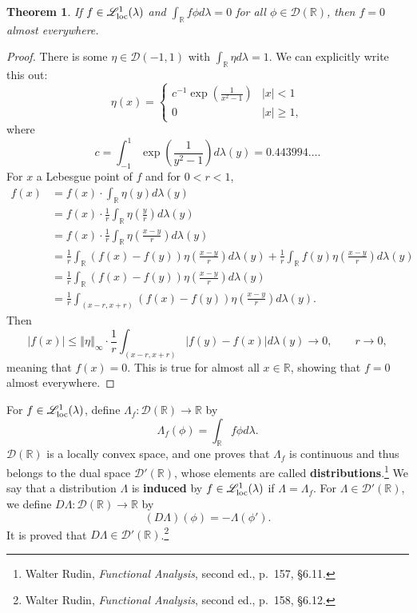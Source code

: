 \documentclass{article}
\newcommand{\Lsemiloc}{\mathscr{L}_{\ensuremath\mathrm{loc}}^1(\lambda)}
\newcommand{\norm}[1]{\left\Vert #1 \right\Vert}
\newtheorem{theorem}{Theorem}
\theoremstyle{definition}
\begin{document}
\begin{theorem}
If $f \in \Lsemiloc$  and $\int_\mathbb{R} f \phi d\lambda =0$ for all $\phi \in \mathscr{D}(\mathbb{R})$, then
$f=0$ almost everywhere.
\label{fundamental}
\end{theorem}
\begin{proof}
There is some $\eta \in \mathscr{D}(-1,1)$ with  
$\int_\mathbb{R} \eta d\lambda = 1$. We can explicitly write this out: 
\[
\eta(x) =\begin{cases}
c^{-1}  \exp\left(\frac{1}{x^2-1}\right)&|x|<1\\
 0&|x| \geq 1,
 \end{cases}
\]
where
\[
c = \int_{-1}^1 \exp\left(\frac{1}{y^2-1}\right) d\lambda(y)  = 0.443994\ldots.
\]
For $x$ a Lebesgue point of $f$   and for $0<r<1$,
\begin{align*}
f(x)&=f(x) \cdot \int_\mathbb{R} \eta(y) d\lambda(y)\\
&=f(x) \cdot \frac{1}{r} \int_\mathbb{R} \eta\left(\frac{y}{r} \right) d\lambda(y)\\
&=f(x) \cdot \frac{1}{r} \int_\mathbb{R}\eta\left(\frac{x-y}{r} \right) d\lambda(y)\\
&=\frac{1}{r} \int_\mathbb{R} (f(x)-f(y))\eta\left(\frac{x-y}{r} \right) d\lambda(y) 
+\frac{1}{r} \int_\mathbb{R} f(y) \eta\left(\frac{x-y}{r} \right) d\lambda(y)\\
&=\frac{1}{r} \int_\mathbb{R} (f(x)-f(y))\eta\left(\frac{x-y}{r} \right) d\lambda(y)\\
&=\frac{1}{r} \int_{(x-r,x+r)} (f(x)-f(y))\eta\left(\frac{x-y}{r} \right) d\lambda(y).
\end{align*}
Then
\[
|f(x)| \leq \norm{\eta}_\infty \cdot \frac{1}{r} \int_{(x-r,x+r)} |f(y)-f(x)| d\lambda(y)
\to 0,\qquad r \to 0,
\]
meaning that $f(x)=0$. This is true for almost all $x \in \mathbb{R}$, showing that
$f=0$ almost everywhere.
\end{proof}


For $f \in \Lsemiloc$, define $\Lambda_f:\mathscr{D}(\mathbb{R}) \to \mathbb{R}$ by
\[
\Lambda_f(\phi) = \int_\mathbb{R}  f \phi d\lambda.
\]
$\mathscr{D}(\mathbb{R})$ is a locally convex space, 
and one proves that $\Lambda_f$ is continuous and thus belongs to 
the dual space $\mathscr{D}'(\mathbb{R})$, whose elements are called \textbf{distributions}.\footnote{Walter
Rudin, {\em Functional Analysis}, second ed., p.~157, \S 6.11.} We say that a distribution $\Lambda$ is \textbf{induced} by
$f \in \Lsemiloc$ if $\Lambda=\Lambda_f$. 
For $\Lambda \in \mathscr{D}'(\mathbb{R})$, we define $D\Lambda:\mathscr{D}(\mathbb{R}) \to \mathbb{R}$ by 
\[ 
(D\Lambda)(\phi) = - \Lambda(\phi').
\]
It is proved that $D\Lambda \in \mathscr{D}'(\mathbb{R})$.\footnote{Walter
Rudin, {\em Functional Analysis}, second ed., p.~158, \S 6.12.}
\end{document}
